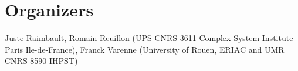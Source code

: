 \documentclass[11pt]{article}
\newcommand{\noun}[1]{\textsc{#1}}
\begin{document}
\section*{Organizers}

Juste Raimbault, Romain Reuillon (UPS CNRS 3611 Complex System Institute Paris Ile-de-France), Franck Varenne (University of Rouen, ERIAC and UMR CNRS 8590 IHPST)











%
%
\end{document}
